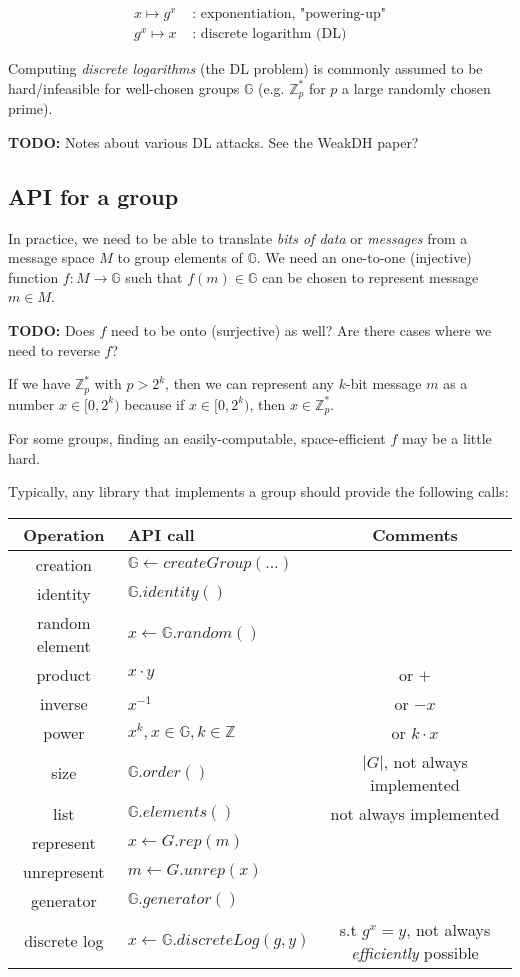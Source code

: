 \documentclass[12pt]{article}
\newcommand{\Zp}{\mathbb{Z}^{\ast}_p}
\newcommand{\G}{\mathbb{G}}
\newcommand{\todo}{\textbf{TODO:} }
\begin{document}
\begin{align*}
x \mapsto g^x & \text{ : exponentiation, "powering-up"}\\
g^x \mapsto x & \text{ : discrete logarithm (DL)}
\end{align*}

Computing \emph{discrete logarithms} (the DL problem) is commonly assumed to be
hard/infeasible for well-chosen groups $\G$ (e.g. $\Zp$ for $p$ a large randomly
chosen prime).

\todo Notes about various DL attacks. See the WeakDH paper?

\subsection{API for a group}

In practice, we need to be able to translate \emph{bits of data} or
\emph{messages} from a message space $M$ to group elements of $\G$. We need an
one-to-one (injective) function $f : M
\rightarrow \G$ such that $f(m) \in \G$ can be chosen to represent message $m
\in M$.

\todo Does $f$ need to be onto (surjective) as well? Are there cases
where we need to reverse $f$?

\begin{example}
If we have $\Zp$ with $p > 2^k$, then we can represent any $k$-bit
message $m$ as a number $x \in [0, 2^k)$ because if $x \in [0, 2^k)$, then $x
\in \Zp$.
\end{example}

\begin{note}
For some groups, finding an easily-computable, space-efficient $f$ may
be a little hard.
\end{note}

Typically, any library that implements a group should provide the following calls:

\begin{center}
\begin{tabular}{ c | l | c }
Operation & API call & Comments \\
\hline\hline
creation & $\G \leftarrow createGroup(\dots)$ &\\
identity & $\G.identity()$ &\\
random element & $x \leftarrow \G.random()$ &\\
product & $x \cdot y$ & or $+$\\
inverse & $x^{-1}$ & or $-x$\\
power & $x^k, x \in \G, k \in \mathbb{Z}$ & or $k\cdot x$\\
size & $\G.order()$ & $|G|$, not always implemented\\
list & $\G.elements()$ & not always implemented\\
represent & $x \leftarrow G.rep(m)$ &\\
unrepresent & $m \leftarrow G.unrep(x)$ &\\
generator & $\G.generator()$ &\\
discrete log & $x \leftarrow \G.discreteLog(g, y)$ & s.t $g^x = y$, not always
\emph{efficiently} possible \\
\end{tabular}
\end{center}
\end{document}
